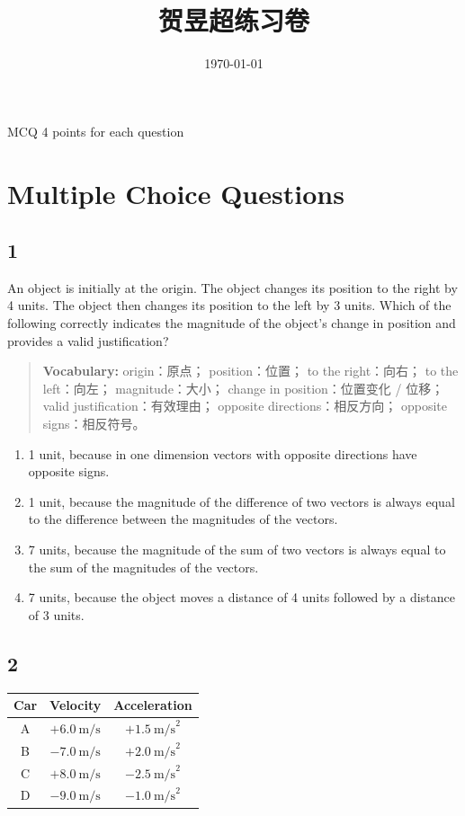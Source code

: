 \documentclass[12pt,a4paper]{article}
\title{\textbf{贺昱超练习卷}}
\author{}
\date{\today}
\newcommand{\vocab}[1]{
\begin{quote}
\small
\textbf{Vocabulary:} #1
\end{quote}
}
\begin{document}
\maketitle

\begin{center}
\Large MCQ 4 points for each question
\end{center}

\section*{Multiple Choice Questions}

\subsection*{1}

An object is initially at the origin. The object changes its position to the right by 4 units. The object then changes its position to the left by 3 units. Which of the following correctly indicates the magnitude of the object's change in position and provides a valid justification?

\vocab{
origin：原点；
position：位置；
to the right：向右；
to the left：向左；
magnitude：大小；
change in position：位置变化 / 位移；
valid justification：有效理由；
opposite directions：相反方向；
opposite signs：相反符号。
}

\begin{enumerate}[label=(\Alph*)]
    \item 1 unit, because in one dimension vectors with opposite directions have opposite signs.
    \item 1 unit, because the magnitude of the difference of two vectors is always equal to the difference between the magnitudes of the vectors.
    \item 7 units, because the magnitude of the sum of two vectors is always equal to the sum of the magnitudes of the vectors.
    \item 7 units, because the object moves a distance of 4 units followed by a distance of 3 units.
\end{enumerate}

\subsection*{2}

\begin{center}
\begin{tabular}{|c|c|c|}
\hline
Car & Velocity & Acceleration \\
\hline
A & $+6.0\ \text{m/s}$ & $+1.5\ \text{m/s}^2$ \\
\hline
B & $-7.0\ \text{m/s}$ & $+2.0\ \text{m/s}^2$ \\
\hline
C & $+8.0\ \text{m/s}$ & $-2.5\ \text{m/s}^2$ \\
\hline
D & $-9.0\ \text{m/s}$ & $-1.0\ \text{m/s}^2$ \\
\hline
\end{tabular}
\end{center}
\end{document}
